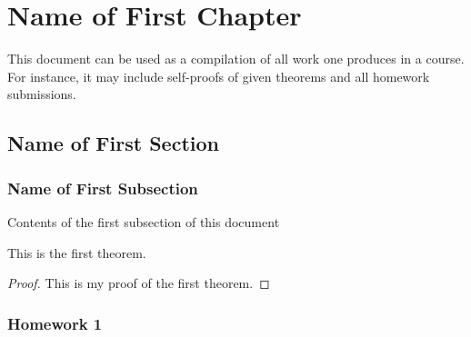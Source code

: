 \documentclass[11pt, titlepage, a4paper, oneside]{book}
\begin{document}
%

%
\tableofcontents
\thispagestyle{empty}
\newpage
\setcounter{page}{1}
%
\chapter{Name of First Chapter}
This document can be used as a compilation of all work one produces in a course. For instance, it may include self-proofs of given theorems and all homework submissions. 
\section{Name of First Section}
\subsection{Name of First Subsection}
Contents of the first subsection of this document
\begin{theorem}
    This is the first theorem.
\end{theorem}
\begin{proof}
    This is my proof of the first theorem.
\end{proof}

\subsection{Homework 1}
\end{document}
